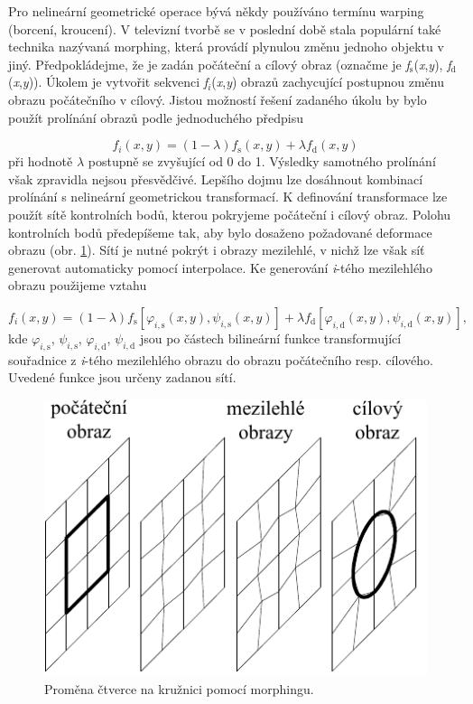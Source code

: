 Pro nelineární geometrické operace bývá někdy používáno termínu warping (borcení, kroucení). V televizní tvorbě se v poslední době stala populární také technika nazývaná morphing, která provádí plynulou změnu jednoho objektu v jiný. Předpokládejme, že je zadán počáteční a cílový obraz (označme je \textit{f}$_\mathrm{s}$(\textit{x},\textit{y}), \textit{f}$_\mathrm{d}$(\textit{x},\textit{y})). Úkolem je vytvořit sekvenci \textit{f}$_i$(\textit{x},\textit{y}) obrazů zachycující postupnou změnu obrazu počátečního v cílový. Jistou možností řešení zadaného úkolu by bylo použít prolínání obrazů podle jednoduchého předpisu

\begin{equation} \label{eq:6_33}
    f_{i} \left(x,y\right)=\left(1-\lambda \right)f_\mathrm{s} \left(x,y\right)+\lambda f_\mathrm{d} \left(x,y\right)
\end{equation}
při hodnotě $\lambda$ postupně se zvyšující od 0 do 1. Výsledky samotného prolínání však zpravidla nejsou přesvědčivé. Lepšího dojmu lze dosáhnout kombinací prolínání s nelineární geometrickou transformací. K definování transformace lze použít sítě kontrolních bodů, kterou pokryjeme počáteční i cílový obraz. Polohu kontrolních bodů předepíšeme tak, aby bylo dosaženo požadované deformace obrazu (obr. \ref{img:6_10}). Sítí je nutné pokrýt i obrazy mezilehlé, v nichž lze však síť generovat automaticky pomocí interpolace. Ke generování \textit{i}-tého mezilehlého obrazu použijeme vztahu

\begin{equation} \label{eq:6_34}
    f_i (x, y) = (1 - \lambda) f_\mathrm{s} \left[ \varphi_{i, \mathrm{s}}(x, y), \psi_{i, \mathrm{s}} (x, y) \right] + \lambda f_\mathrm{d} \left[ \varphi_{i, \mathrm{d}} (x, y), \psi_{i, \mathrm{d}} (x,y) \right],
\end{equation}
kde $\varphi_{i, \mathrm{s}}$, $\psi_{i, \mathrm{s}}$, $\varphi_{i, \mathrm{d}}$, $\psi_{i, \mathrm{d}}$ jsou po částech bilineární funkce transformující souřadnice z \textit{i}-tého mezilehlého obrazu do obrazu počátečního resp. cílového. Uvedené funkce jsou určeny zadanou sítí.

\begin{figure}[th]
    \begin{center}
        \includegraphics[scale=1.0]{06_bodoveoperace/images/img_6_10.pdf}
    \end{center}
    \caption{Proměna čtverce na kružnici pomocí morphingu.}
    \label{img:6_10}
\end{figure}

